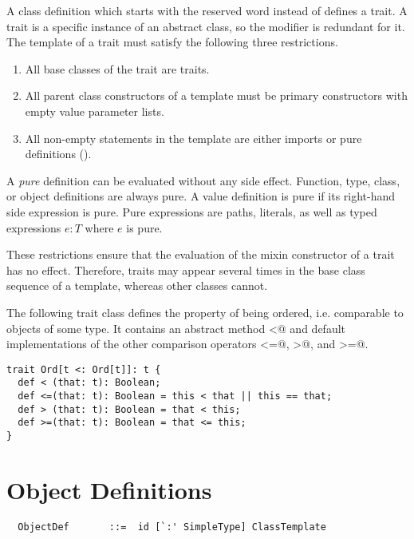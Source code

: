 \documentclass[a4paper,12pt,twoside,titlepage]{book}
\begin{document}
A class definition which starts with the reserved word 
instead of  defines a trait. A trait is a specific
instance of an abstract class, so the  modifier is
redundant for it.  The template of a trait must satisfy the following
three restrictions.
\begin{enumerate}
\item All base classes of the trait are traits.
\item All parent class constructors of a template
      must be primary constructors with empty value
      parameter lists. 
\item All non-empty statements in the template are either imports or pure definitions ().
\end{enumerate}
A {\em pure} definition can be evaluated without any side effect.
Function, type, class, or object definitions are always pure. A value
definition is pure if its right-hand side expression is pure. Pure
expressions are paths, literals, as well as typed expressions
$e: T$ where $e$ is pure.

These restrictions ensure that the evaluation of the mixin constructor
of a trait has no effect. Therefore, traits may appear several times 
in the base class sequence of a template, whereas other classes cannot.

\example\label{ex:comparable}
The following trait class defines the property of being
ordered, i.e. comparable to objects of some type. It contains an abstract method
\lstinline@<@ and default implementations of the other comparison operators
\lstinline@<=@, \lstinline@>@, and \lstinline@>=@.

\begin{lstlisting}
trait Ord[t <: Ord[t]]: t {
  def < (that: t): Boolean;
  def <=(that: t): Boolean = this < that || this == that;
  def > (that: t): Boolean = that < this;
  def >=(that: t): Boolean = that <= this;
}
\end{lstlisting}

\section{Object Definitions}
\label{sec:modules}
\label{sec:object-defs}

\syntax\begin{lstlisting}
  ObjectDef       ::=  id [`:' SimpleType] ClassTemplate
\end{lstlisting}
\end{document}
